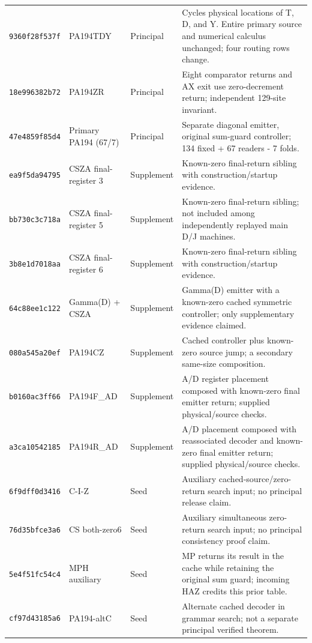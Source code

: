 {\begin{longtable}{@{}>{\raggedright\arraybackslash}p{}>{\raggedright\arraybackslash}p{}>{\raggedright\arraybackslash}p{}>{\raggedright\arraybackslash}p{}@{}}
\texttt{9360f28f537f} & PA194TDY & Principal & Cycles physical locations of T, D, and Y. Entire primary source and numerical calculus unchanged; four routing rows change.\\[3pt]
\texttt{18e996382b72} & PA194ZR & Principal & Eight comparator returns and AX exit use zero-decrement return; independent 129-site invariant.\\[3pt]
\texttt{47e4859f85d4} & Primary PA194 (67/7) & Principal & Separate diagonal emitter, original sum-guard controller; 134 fixed + 67 readers - 7 folds.\\[3pt]
\texttt{ea9f5da94795} & CSZA final-register 3 & Supplement & Known-zero final-return sibling with construction/startup evidence.\\[3pt]
\texttt{bb730c3c718a} & CSZA final-register 5 & Supplement & Known-zero final-return sibling; not included among independently replayed main D/J machines.\\[3pt]
\texttt{3b8e1d7018aa} & CSZA final-register 6 & Supplement & Known-zero final-return sibling with construction/startup evidence.\\[3pt]
\texttt{64c88ee1c122} & Gamma(D) + CSZA & Supplement & Gamma(D) emitter with a known-zero cached symmetric controller; only supplementary evidence claimed.\\[3pt]
\texttt{080a545a20ef} & PA194CZ & Supplement & Cached controller plus known-zero source jump; a secondary same-size composition.\\[3pt]
\texttt{b0160ac3ff66} & PA194F\_AD & Supplement & A/D register placement composed with known-zero final emitter return; supplied physical/source checks.\\[3pt]
\texttt{a3ca10542185} & PA194R\_AD & Supplement & A/D placement composed with reassociated decoder and known-zero final emitter return; supplied physical/source checks.\\[3pt]
\texttt{6f9dff0d3416} & C-I-Z & Seed & Auxiliary cached-source/zero-return search input; no principal release claim.\\[3pt]
\texttt{76d35bfce3a6} & CS both-zero6 & Seed & Auxiliary simultaneous zero-return search input; no principal consistency proof claim.\\[3pt]
\texttt{5e4f51fc54c4} & MPH auxiliary & Seed & MP returns its result in the cache while retaining the original sum guard; incoming HAZ credits this prior table.\\[3pt]
\texttt{cf97d43185a6} & PA194-altC & Seed & Alternate cached decoder in grammar search; not a separate principal verified theorem.\\[3pt]

\end{longtable}}
